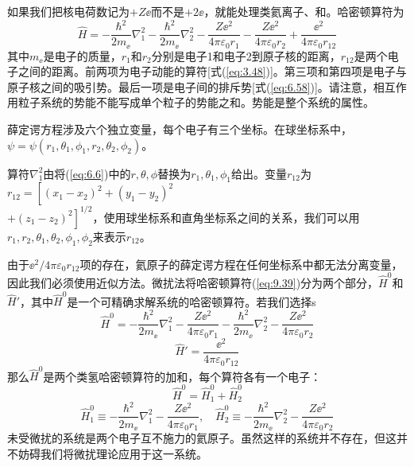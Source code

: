     如果我们把核电荷数记为$+Z\ee $而不是$+2\ee $，就能处理类氦离子、和。哈密顿算符为
    \begin{equation}
        \hat{H} = -\frac{\hbar^2}{2m_{\ee }}\nabla_1^2 - \frac{\hbar^2}{2m_{\ee }}\nabla_2^2 - \frac{Z\ee ^2}{4\pi\varepsilon_0r_1} - \frac{Z\ee ^2}{4\pi\varepsilon_0r_2} + \frac{\ee ^2}{4\pi\varepsilon_0r_{12}}
        \label{eq:9.39}
    \end{equation}
    其中$m_{\ee }$是电子的质量，$r_1$和$r_2$分别是电子1和电子2到原子核的距离，$r_{12}$是两个电子之间的距离。前两项为电子动能的算符[式(\ref{eq:3.48})]。第三项和第四项是电子与原子核之间的吸引势。最后一项是电子间的排斥势[式(\ref{eq:6.58})]。请注意，相互作用粒子系统的势能不能写成单个粒子的势能之和。势能是整个系统的属性。

    薛定谔方程涉及六个独立变量，每个电子有三个坐标。在球坐标系中，$\psi = \psi\left(r_1,\theta_1,\phi_1,r_2,\theta_2,\phi_2\right)$。

    算符$\nabla_1^2$由将(\ref{eq:6.6})中的$r,\theta,\phi$替换为$r_1,\theta_1,\phi_1$给出。变量$r_{12}$为$r_{12} = \left[\left(x_1 - x_2\right)^2 + \left(y_1 - y_2\right)^2\right.$\\$\left. + \left(z_1 - z_2\right)^2\right]^{1/2}$，使用球坐标系和直角坐标系之间的关系，我们可以用$r_1,r_2,\theta_1,\theta_2,\phi_1,\phi_2$来表示$r_{12}$。

    由于$\ee ^2 / 4\pi \varepsilon_0r_{12}$项的存在，氦原子的薛定谔方程在任何坐标系中都无法分离变量，因此我们必须使用近似方法。微扰法将哈密顿算符(\ref{eq:9.39})分为两个部分，$\hat{H}^0$和$\hat{H}'$，其中$\hat{H}^0$是一个可精确求解系统的哈密顿算符。若我们选择s
    \begin{equation}
        \hat{H}^0 = -\frac{\hbar^2}{2m_{\ee }}\nabla_1^2 - \frac{Z\ee ^2}{4\pi\varepsilon_0r_1} - \frac{\hbar^2}{2m_{\ee }}\nabla_2^2 - \frac{Z\ee ^2}{4\pi\varepsilon_0r_2}
        \label{eq:9.40}
    \end{equation}
    \begin{equation}
        \hat{H}' = \frac{\ee ^2}{4\pi\varepsilon_0r_{12}}
        \label{eq:9.41}
    \end{equation}
    那么$\hat{H}^0$是两个类氢哈密顿算符的加和，每个算符各有一个电子：
    \begin{equation}
        \hat{H}^0 = \hat{H}_1^0 + \hat{H}_2^0
        \label{eq:9.42}
    \end{equation}
    \begin{equation}
        \hat{H}_1^0 \equiv -\frac{\hbar^2}{2m_{\ee }}\nabla_1^2 - \frac{Z\ee ^2}{4\pi\varepsilon_0r_1}, \quad \hat{H}_2^0 \equiv -\frac{\hbar^2}{2m_{\ee }}\nabla_2^2 - \frac{Z\ee ^2}{4\pi\varepsilon_0r_2}
        \label{eq:9.43}
    \end{equation}
    未受微扰的系统是两个电子互不施力的氦原子。虽然这样的系统并不存在，但这并不妨碍我们将微扰理论应用于这一系统。

